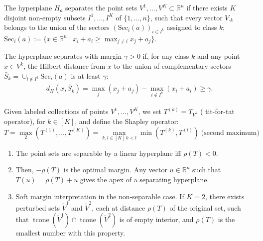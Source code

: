 \documentclass[12pt]{beamer}
\newcommand{\tcone}{\operatorname{tcone}}
\newcommand{\bl}[1]{{\color{blue} #1}}
\newcommand{\R}{\mathbb{R}}
\begin{document}
\begin{frame}[plain]
The hyperplane $H_a$ \bl{separates} the point sets $V^1, \ldots, V^K\subset \R^n$ if there exists $K$ disjoint non-empty subsets $I^1, \ldots, I^K$ of $\{1,\dots,n\}$, such that every vector $V_{\cdot k}$
  belongs to the union of the sectors $(\text{Sec}_i(a))_{i\in I^k}$ assigned to class $k$; $\text{Sec}_i(a) := \{x\in \R^n\mid x_i + a_i \geq \max_{j\neq i} x_j + a_j\}$.

  \vfill
\begin{center}
        \resizebox{0.2\linewidth}{!}{%
        \centering
    \clipbox{0.15\width{} 0.15\height{} 0.15\width{} 0.15\height{}}{}
        }
\end{center}
  \vfill
The hyperplane separates \bl{with margin $\gamma > 0$} if, for any class $k$ and any point $x \in V^k$, the Hilbert distance from $x$ to the union of complementary sectors $\bar{S}_k= \cup_{i\not\in I^k} \text{Sec}_i(a)$
is at least $\gamma$:
\begin{align*}
d_H(x, \bar{S}_k) = \max_j(x_j + a_j) - \max_{i \not\in I^k}(x_i + a_i) \geq \gamma.
\end{align*}
\end{frame}
\begin{frame}[plain]
Given labeled collections of points $V^1,\dots,V^K$, we
set $T^{(k)}= T_{V^k}$ (\bl{tit-for-tat operator}), for $k\in[K]$, and define
the Shapley operator:
  \[
  T \!=\! {\textstyle\max_2} (T^{(1)},\dots, T^{(K)})\!=\!\!\!\max_{k,l\in[K]\,k<l} \min(T^{(k)}, T^{(l)})\; \text{(second maximum)}
  \]
  
  \begin{theorem}
    \begin{enumerate}
\item The point sets are separable by a linear hyperplane iff $\rho(T)<0$.
\item Then, \bl{$-\rho(T)$ is the optimal margin}. Any vector $u\in \R^n$
  such that $T(u)=\rho(T)+u$ gives the \bl{apex of a separating hyperplane}.
\item \bl{Soft margin interpretation in the non-separable case}.
  If $K=2$, there exists perturbed sets
  $\tilde{V}^1$   and $\tilde{V}^2$, each at distance $\rho(T)$ of the original set, such that
  $\tcone(\tilde{V}^1)\cap \tcone(\tilde{V}^2)$ is of empty interior,
  and $\rho(T)$ is the smallest number with this property.
      \end{enumerate}
    \end{theorem}
\end{frame}
\end{document}
